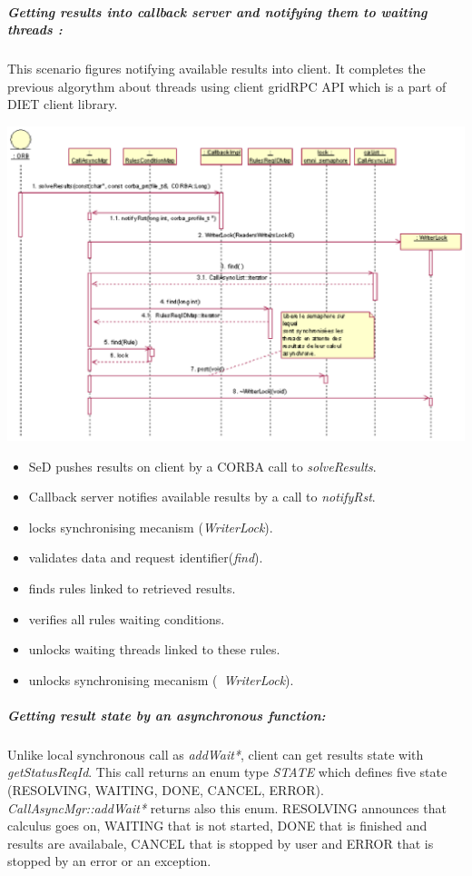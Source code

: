   \subparagraph{Getting results into callback server and notifying them to waiting threads :}
  This scenario figures notifying available results into client. It completes
  the previous algorythm about threads using client gridRPC API which is a 
  part of DIET client library.

  \begin{center}
  \includegraphics{./fig/CallbackSynchronisationSequenceDiagram.ps}
  \end{center}

  \begin{itemize}
  \item SeD pushes results on client by a CORBA call to \emph{solveResults}.
  \item Callback server notifies available results by a call to \emph{notifyRst}.
  \item locks synchronising mecanism (\emph{WriterLock}).
  \item validates data and request identifier(\emph{find}).
  \item finds rules linked to retrieved results.
  \item verifies all rules waiting conditions.
  \item unlocks waiting threads linked to these rules.
  \item unlocks synchronising mecanism (\emph{~WriterLock}).
  \end{itemize}

  \subparagraph{Getting result state by an asynchronous function:}
  Unlike local synchronous call as \emph{addWait*}, client can get results
  state with \emph{getStatusReqId}. This call returns an enum type \emph{STATE}
  which defines five state (RESOLVING, WAITING, DONE, CANCEL, ERROR). 
  \emph{CallAsyncMgr::addWait*} returns also this enum.
  RESOLVING announces that calculus goes on, WAITING that is not started, 
  DONE that is finished and results are availabale, CANCEL that is stopped
  by user and ERROR that is stopped by an error or an exception. 

